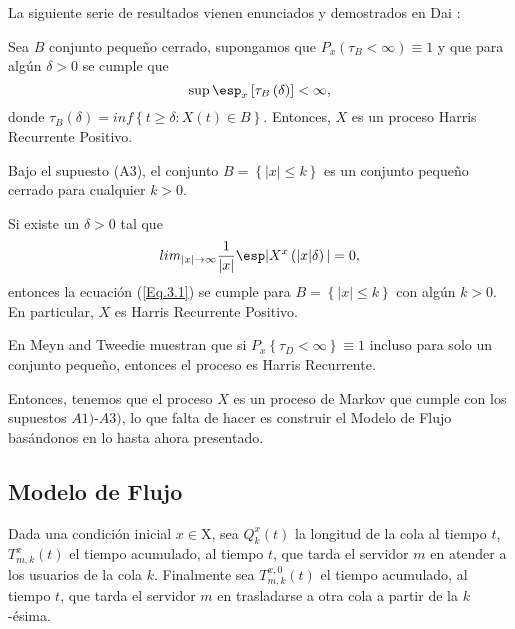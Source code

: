 La siguiente serie de resultados vienen enunciados y demostrados
en Dai \cite{Dai}:
\begin{Lema}
Sea $B$ conjunto peque\~no cerrado, supongamos que
$P_{x}\left(\tau_{B}<\infty\right)\equiv1$ y que para alg\'un
$\delta>0$ se cumple que
\begin{equation}\label{Eq.3.1}
\sup\esp_{x}\left[\tau_{B}\left(\delta\right)\right]<\infty,
\end{equation}
donde
$\tau_{B}\left(\delta\right)=inf\left\{t\geq\delta:X\left(t\right)\in
B\right\}$. Entonces, $X$ es un proceso Harris Recurrente
Positivo.
\end{Lema}

\begin{Lema}\label{Lema.3.}
Bajo el supuesto (A3), el conjunto $B=\left\{|x|\leq k\right\}$ es
un conjunto peque\~no cerrado para cualquier $k>0$.
\end{Lema}

\begin{Teo}\label{Tma.3.1}
Si existe un $\delta>0$ tal que
\begin{equation}
lim_{|x|\rightarrow\infty}\frac{1}{|x|}\esp|X^{x}\left(|x|\delta\right)|=0,
\end{equation}
entonces la ecuaci\'on (\ref{Eq.3.1}) se cumple para
$B=\left\{|x|\leq k\right\}$ con alg\'un $k>0$. En particular, $X$
es Harris Recurrente Positivo.
\end{Teo}

\begin{Note}
En Meyn and Tweedie \cite{MeynTweedie} muestran que si
$P_{x}\left\{\tau_{D}<\infty\right\}\equiv1$ incluso para solo un
conjunto peque\~no, entonces el proceso es Harris Recurrente.
\end{Note}

Entonces, tenemos que el proceso $X$ es un proceso de Markov que
cumple con los supuestos $A1)$-$A3)$, lo que falta de hacer es
construir el Modelo de Flujo bas\'andonos en lo hasta ahora
presentado.
\subsection{Modelo de Flujo}

Dada una condici\'on inicial $x\in\textrm{X}$, sea
$Q_{k}^{x}\left(t\right)$ la longitud de la cola al tiempo $t$,
$T_{m,k}^{x}\left(t\right)$ el tiempo acumulado, al tiempo $t$,
que tarda el servidor $m$ en atender a los usuarios de la cola
$k$. Finalmente sea $T_{m,k}^{x,0}\left(t\right)$ el tiempo
acumulado, al tiempo $t$, que tarda el servidor $m$ en trasladarse
a otra cola a partir de la $k$-\'esima.\\

